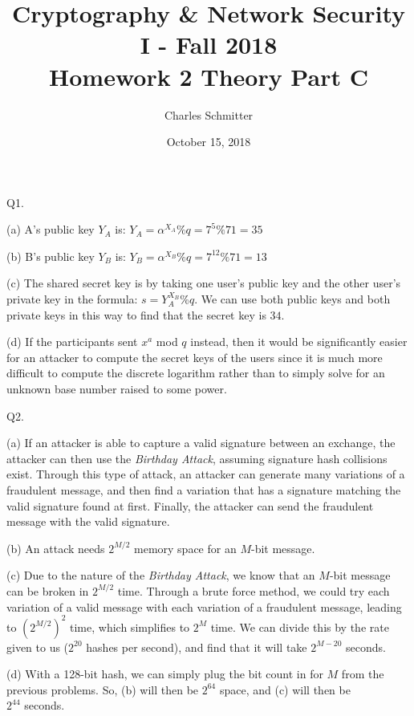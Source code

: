 \documentclass[11pt]{article}
\title{Cryptography \& Network Security I - Fall 2018\\ \large Homework 2 Theory Part C}
\author{Charles Schmitter}
\date{October 15, 2018}
\newcommand{\gap}{\vspace{3mm}}
\newcommand{\bigGap}{\vspace{10mm}}
\begin{document}
\maketitle

Q1. 

\gap{}

(a) A's public key $Y_A$ is: $Y_A = \alpha^{X_A}\%q=7^5\%71=35$

(b) B's public key $Y_B$ is: $Y_B = \alpha^{X_B}\%q=7^12\%71=13$

(c) The shared secret key is by taking one user's public key and the other user's private key in the formula: $s=Y_A^{X_B}\%q$. We can use both public keys and both private keys in this way to find that the secret key is $34$.

(d) If the participants sent $x^a$ mod $q$ instead, then it would be significantly easier for an attacker to compute the secret keys of the users since it is much more difficult to compute the discrete logarithm rather than to simply solve for an unknown base number raised to some power.

\bigGap{}

Q2. 

\gap{}

(a) If an attacker is able to capture a valid signature between an exchange, the attacker can then use the \textit{Birthday Attack}, assuming signature hash collisions exist. Through this type of attack, an attacker can generate many variations of a fraudulent message, and then find a variation that has a signature matching the valid signature found at first. Finally, the attacker can send the fraudulent message with the valid signature.

(b) An attack needs $2^{M/2}$ memory space for an $M$-bit message.

(c) Due to the nature of the \textit{Birthday Attack}, we know that an $M$-bit message can be broken in $2^{M/2}$ time. Through a brute force method, we could try each variation of a valid message with each variation of a fraudulent message, leading to $(2^{M/2})^2$ time, which simplifies to $2^M$ time. We can divide this by the rate given to us ($2^20$ hashes per second), and find that it will take $2^{M-20}$ seconds.

(d) With a 128-bit hash, we can simply plug the bit count in for $M$ from the previous problems. So, (b) will then be $2^64$ space, and (c) will then be\\
$2^{44}$ seconds.

\bigGap{}
\end{document}
